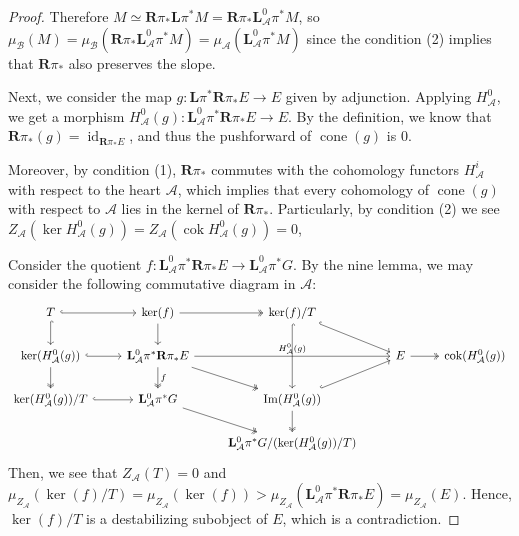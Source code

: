\documentclass[12pt]{amsart}
\theoremstyle{definition}
\DeclareMathOperator{\cone}{cone}
\DeclareMathOperator{\Img}{Im}
\DeclareMathOperator{\id}{id}
\DeclareMathOperator{\cok}{cok}
\begin{document}
\begin{proof}
Therefore $M \simeq \mathbf{R}\pi_\ast \mathbf{L}\pi^\ast M = \mathbf{R}\pi_\ast \mathbf{L}^0_{\mathcal{A}} \pi^\ast M$, 
so $\mu_{\mathcal{B}}(M) = \mu_{\mathcal{B}}(\mathbf{R}\pi_\ast \mathbf{L}^0_{\mathcal{A}} \pi^\ast M) = \mu_{\mathcal{A}}(\mathbf{L}^0_{\mathcal{A}}\pi^\ast M)$ since the condition (2) implies that $\mathbf{R}\pi_\ast$ also preserves the slope. 

Next, we consider the map $g \colon \mathbf{L}\pi^\ast \mathbf{R}\pi_\ast E \longrightarrow E$ given by adjunction.
Applying $H^0_{\mathcal{A}}$, we get a morphism $H^0_{\mathcal{A}}(g) \colon \mathbf{L}^0_{\mathcal{A}}\pi^\ast \mathbf{R}\pi_\ast E \longrightarrow E$.
By the definition, we know that $\mathbf{R} \pi_\ast (g) = \id_{\mathbf{R}\pi_\ast E}$,
and thus the pushforward of $\cone(g)$ is $0$.

Moreover, by condition (1),
$\mathbf{R} \pi_\ast$ commutes with the cohomology functors $H^i_{\mathcal{A}}$ with respect to the heart $\mathcal{A}$, 
which implies that every cohomology of $\cone(g)$ with respect to $\mathcal{A}$ lies in the kernel of $\mathbf{R}\pi_\ast$.
Particularly, by condition (2)
we see
$Z_{\mathcal{A}}(\ker H^0_{\mathcal{A}}(g))=Z_{\mathcal{A}}(\cok H^0_{\mathcal{A}}(g))=0$,

Consider the quotient $f \colon \mathbf{L}^0_{\mathcal{A}}\pi^\ast \mathbf{R}\pi_\ast E \longrightarrow  \mathbf{L}^0_{\mathcal{A}}\pi^\ast G$.
By the nine lemma, we may consider the following commutative diagram in $\mathcal{A}$:
\[
\begin{tikzcd}
T \arrow[r, hook] \arrow[d, hook]    & \ker (f) \arrow[d] \arrow[r, two heads]                                                                                   & \ker (f)/T \arrow[rd,  hook] \arrow[dd, hook]                                      &                                             &    \\
\ker (H^0_{\mathcal{A}}(g)) \arrow[r, hook] \arrow[d, two heads] &  \mathbf{L}^0_{\mathcal{A}}\pi^\ast \mathbf{R}\pi_\ast E \arrow[d, "f", two heads] \arrow[rd, two heads] \arrow[rr, "H^0_{\mathcal{A}}(g)"] &                                                                               & E \arrow[r, two heads]  & \cok(H^0_{\mathcal{A}}(g)) \\
\ker(H^0_{\mathcal{A}}(g))/T\arrow[r, hook]                  & \mathbf{L}^0_{\mathcal{A}}\pi^\ast G \arrow[rd, two heads]                                                                           & \Img (H^0_{\mathcal{A}}(g)) \arrow[d, two heads] \arrow[ru, hook]                                      &    \\ &           & \mathbf{L}^0_{\mathcal{A}}\pi^\ast G/(\ker(H^0_{\mathcal{A}}(g))/T)       &     &   
\end{tikzcd}
\]
Then, we see that $Z_{\mathcal{A}}(T)=0$ and $\mu_{Z_{\mathcal{A}}}(\ker(f)/T) = \mu_{Z_{\mathcal{A}}}(\ker(f)) > \mu_{Z_{\mathcal{A}}}(\mathbf{L}^0_{\mathcal{A}}\pi^\ast \mathbf{R}\pi_\ast E ) = \mu_{Z_{\mathcal{A}}}(E)$.
Hence, $\ker(f)/T$ is a destabilizing subobject of $E$, which is a contradiction.


\end{proof}
\end{document}
